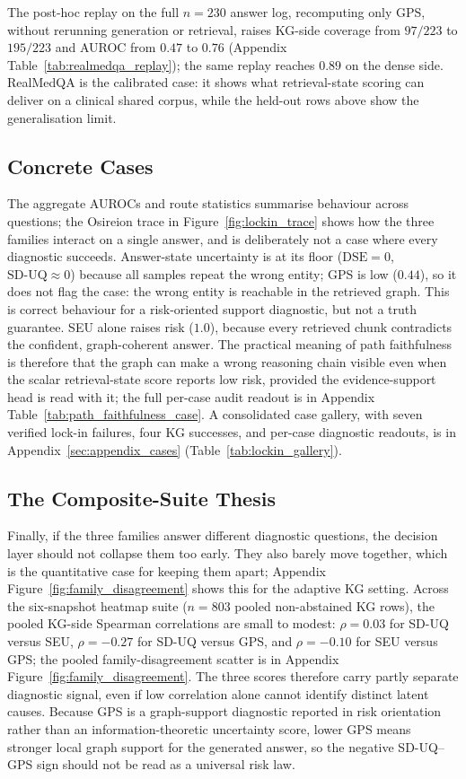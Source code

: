 The post-hoc replay on the full $n=230$ answer log, recomputing only
GPS, without rerunning generation or
retrieval, raises KG-side coverage from $97/223$ to $195/223$ and AUROC from
$0.47$ to $0.76$ (Appendix Table~\ref{tab:realmedqa_replay}); the same replay
reaches $0.89$ on the dense side.
RealMedQA is the calibrated case: it shows what retrieval-state scoring can
deliver on a clinical shared corpus, while the held-out rows above show the
generalisation limit.

\subsection{Concrete Cases}
\label{sec:results_cases}

The aggregate AUROCs and route statistics summarise behaviour across
questions; the Osireion trace in Figure~\ref{fig:lockin_trace} shows
how the three families interact on a single answer, and is deliberately not a
case where every diagnostic succeeds.
Answer-state uncertainty is at its floor ($\mathrm{DSE}=0$,
$\mathrm{SD\text{-}UQ}\approx 0$) because all samples repeat the wrong entity;
GPS is low ($0.44$), so it does not flag the case: the wrong entity is
reachable in the retrieved graph. This is correct behaviour for a
risk-oriented support diagnostic, but not a truth guarantee. SEU alone raises
risk ($1.0$), because every retrieved chunk
contradicts the confident, graph-coherent answer.
The practical meaning of path faithfulness is therefore that the graph can make
a wrong reasoning chain visible even when the scalar retrieval-state score
reports low risk, provided the evidence-support head is read with it; the full
per-case audit readout is in Appendix Table~\ref{tab:path_faithfulness_case}.
A consolidated case gallery, with seven verified lock-in failures, four KG
successes, and per-case diagnostic readouts, is in
Appendix~\ref{sec:appendix_cases} (Table~\ref{tab:lockin_gallery}).

\subsection{The Composite-Suite Thesis}
\label{sec:results_composite}

Finally, if the three families answer different diagnostic questions, the
decision layer should not collapse them too early.
They also barely move together, which is the quantitative case
for keeping them apart; Appendix Figure~\ref{fig:family_disagreement} shows this
for the adaptive KG setting.
Across the six-snapshot heatmap suite ($n=803$ pooled non-abstained KG rows),
the pooled KG-side Spearman correlations are small to modest:
$\rho=0.03$ for SD-UQ versus SEU, $\rho=-0.27$ for SD-UQ versus GPS, and
$\rho=-0.10$ for SEU versus GPS; the pooled family-disagreement scatter is in
Appendix Figure~\ref{fig:family_disagreement}.
The three scores therefore carry partly separate diagnostic signal, even if low
correlation alone cannot identify distinct latent causes.
Because GPS is a graph-support diagnostic reported in risk orientation rather
than an information-theoretic uncertainty score, lower GPS means stronger local
graph support for the generated answer, so the negative SD-UQ--GPS sign should
not be read as a universal risk law.

